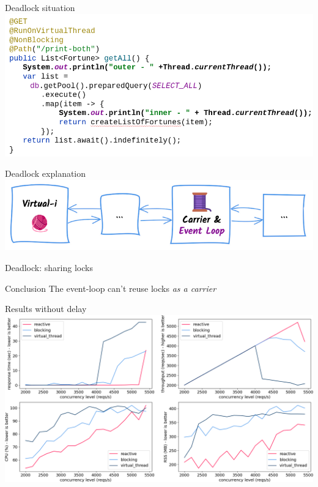 \documentclass{beamer}
\begin{document}
\begin{frame}{Deadlock situation}
    \includegraphics[width=\textwidth]{assets/deadlock.png}
\end{frame}
\begin{frame}{Deadlock explanation}
    \includegraphics[width=\textwidth]{assets/deadlock_situation.png}
\end{frame}
\begin{frame}{Deadlock: sharing locks}
    \begin{alertblock}{Conclusion}
        The event-loop can't reuse locks \emph{as a carrier}
    \end{alertblock}
\end{frame}
\begin{frame}{Results without delay}
    \includegraphics[width=\textwidth]{assets/nano_baseline_19.0.1.png}
\end{frame}
\end{document}
